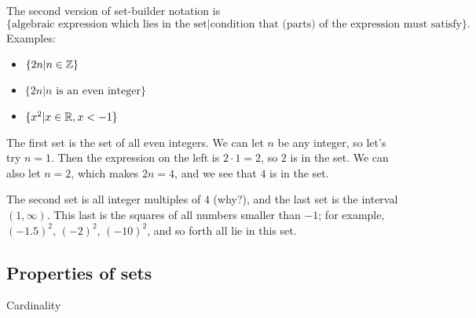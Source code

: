 \documentclass{tufte-book}
\begin{document}
The second version of set-builder notation is
\[
\{ \text{algebraic expression which lies in the set} | \text{condition that (parts) of the expression must satisfy}\}.
\]
Examples:
\begin{itemize}
    \item $\{2n | n \in \mathbb{Z}\}$
    \item $\{2n | n \text{ is an even integer}\}$
    \item $\{x^2 | x \in \mathbb{R}, x < -1\}$
\end{itemize}
The first set is the set of all even integers. We can let $n$ be any integer, so let's try $n = 1$. Then the expression on the left is $2 \cdot 1 = 2$, so $2$ is in the set. We can also let $n = 2$, which makes $2n = 4$, and we see that $4$ is in the set. 

The second set is all integer multiples of $4$ (why?), and the last set is the interval $(1, \infty)$. This last is the squares of all numbers smaller than $-1$; for example, $(-1.5)^2$, $(-2)^2$, $(-10)^2$, and so forth all lie in this set.

\subsection{Properties of sets}
\label{sec:properties-sets}

Cardinality




\end{document}
